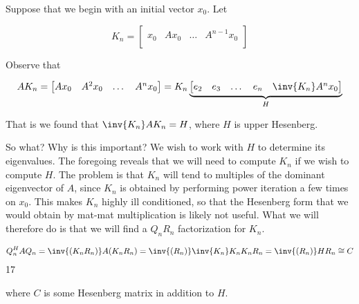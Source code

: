 \documentclass[../main.tex]{subfiles}
\begin{document}
\begin{definition}
    \begin{outline}
        \1 Suppose that we begin with an initial vector $x_0$. Let

        \[
            K_n = \begin{bmatrix}
                x_0 & Ax_0 & \dots & A^{n-1}x_0   \\
            \end{bmatrix}
        \]

        Observe  that 

        \begin{align*}
            AK_n  = \begin{bmatrix}
                   Ax_0 & A^2x_0 & \dots & A^{n}x_0   \\
            \end{bmatrix}
            = K_n
            \underbrace{\begin{bmatrix}
                e_2 & e_3 & \dots & e_n &  \inv{K_n}A^nx_0
            \end{bmatrix}}_{H} 
        \end{align*}

        That is we found that $\inv{K_n}AK_n = H$, where $H$ is upper Hesenberg.
    \end{outline}
\end{definition}

\begin{remark}
    So what? Why is this important? We wish to work with $H$ to determine its eigenvalues.
    The foregoing reveals that we will need to compute $K_n$ if we wish to compute $H$. The problem is that $K_n$ will tend to multiples of the dominant eigenvector of $A$, since $K_n$ is obtained by performing power iteration a few times on $x_0$. This makes $K_n$ highly ill conditioned, so that the Hesenberg form that we would obtain by mat-mat multiplication is likely not useful. What we will therefore do is that we will find a $Q_nR_n$ factorization for $K_n$.
\end{remark}

\begin{remark}
    \begin{align*}
        Q_n^HAQ_n = \inv{(K_nR_n)} A (K_nR_n) = \inv{(R_n)}\inv{K_n}K_nK_n R_n = \inv{(R_n)}HR_n \cong C
    \end{align*}
    17

    where $C$ is some Hesenberg matrix in addition to $H$.
\end{remark}
\end{document}
